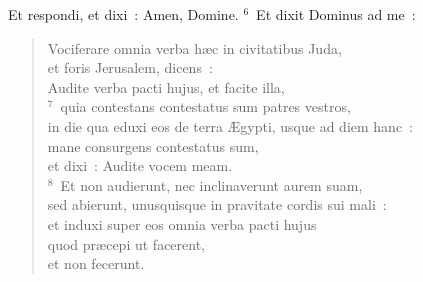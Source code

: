  Et respondi, et dixi~: Amen, Domine.
${}^{6}$~Et dixit Dominus ad me~: \begin{verse}Vociferare omnia verba h\ae c in civitatibus Juda,\\ et foris Jerusalem, dicens~:\\ Audite verba pacti hujus, et facite illa,\\
${}^{7}$~quia contestans contestatus sum patres vestros,\\ in die qua eduxi eos de terra \AE gypti, usque ad diem hanc~:\\ mane consurgens contestatus sum,\\ et dixi~: Audite vocem meam.\\
${}^{8}$~Et non audierunt, nec inclinaverunt aurem suam,\\ sed abierunt, unusquisque in pravitate cordis sui mali~:\\ et induxi super eos omnia verba pacti hujus\\ quod pr\ae cepi ut facerent,\\ et non fecerunt.\end{verse}


